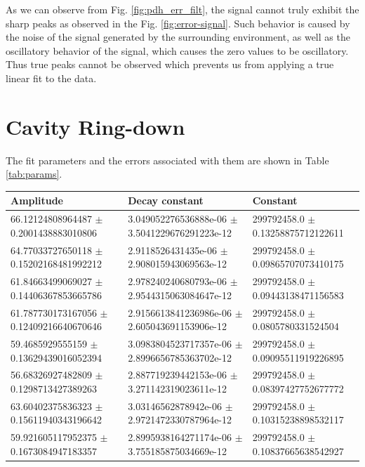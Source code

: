 \documentclass[a4paper]{report}
\numberwithin{equation}{section}
\begin{document}
As we can observe from Fig. \ref{fig:pdh_err_filt}, the signal cannot truly exhibit the sharp peaks as observed in the 
Fig. \ref{fig:error-signal}. Such behavior is caused by the noise of the signal generated by the surrounding environment, as well as the
 oscillatory behavior of the signal, which causes the zero values to be oscillatory. Thus true peaks cannot be observed which 
 prevents us from applying a true linear fit to the data. \par 

\section{Cavity Ring-down}
The fit parameters and the errors associated with them are shown in Table \ref{tab:params}. 

\begin{table}[!ht]
    \centering
    \begin{tabular}{|l|l|l|}
    \hline
        Amplitude & Decay constant & Constant \\ \hline
        66.12124808964487 $\pm$ 0.2001438883010806 & 3.049052276536888e-06 $\pm$ 3.5041229676291223e-12 & 299792458.0 $\pm$ 0.13258875712122611 \\ \hline
        64.77033727650118 $\pm$ 0.15202168481992212 & 2.9118526431435e-06 $\pm$ 2.908015943069563e-12 & 299792458.0 $\pm$ 0.09865707073410175 \\ \hline
        61.84663499069027 $\pm$ 0.14406367853665786 & 2.978240240680793e-06 $\pm$ 2.9544315063084647e-12 & 299792458.0 $\pm$ 0.09443138471156583 \\ \hline
        61.787730173167056 $\pm$ 0.12409216640670646 & 2.9156613841236986e-06 $\pm$ 2.605043691153906e-12 & 299792458.0 $\pm$ 0.0805780331524504 \\ \hline
        59.4685929555159 $\pm$ 0.13629439016052394 & 3.0983804523717357e-06 $\pm$ 2.8996656785363702e-12 & 299792458.0 $\pm$ 0.09095511919226895 \\ \hline
        56.68326927482809 $\pm$ 0.1298713427389263 & 2.887719239442153e-06 $\pm$ 3.271142319023611e-12 & 299792458.0 $\pm$ 0.08397427752677772 \\ \hline
        63.60402375836323 $\pm$ 0.15611940343196642 & 3.03146562878942e-06 $\pm$ 2.9721472330787964e-12 & 299792458.0 $\pm$ 0.10315238898532117 \\ \hline
        59.921605117952375 $\pm$ 0.1673084947183357 & 2.8995938164271174e-06 $\pm$ 3.755185875034669e-12 & 299792458.0 $\pm$ 0.10837665638542927 \\ \hline

\end{tabular}
\end{table}
\end{document}
